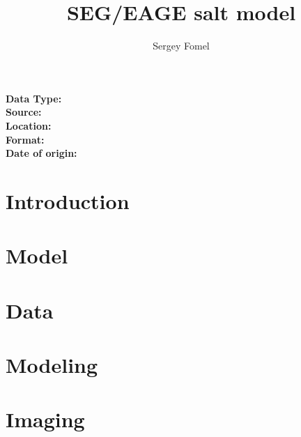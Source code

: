 \title{SEG/EAGE salt model}
\author{Sergey Fomel}
\maketitle

\noindent
\textbf {Data Type:} \\
\textbf {Source:} \\
\textbf {Location:} \\
\textbf {Format:} \\
\textbf{Date of origin:} \\

\section{Introduction}

\section{Model}

\section{Data}

\section{Modeling}

\section{Imaging}


